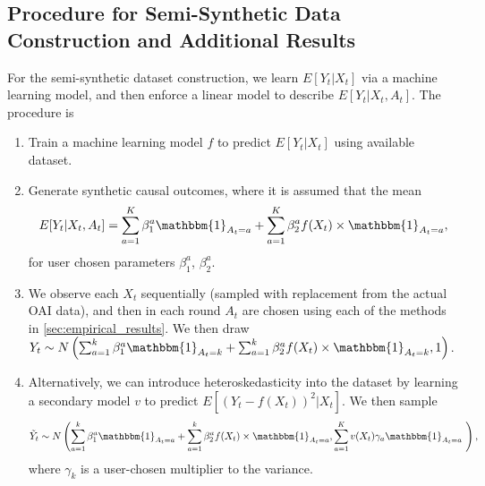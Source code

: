 \documentclass[11pt]{article}
\begin{document}
\begin{appendix}
\section{Procedure for Semi-Synthetic Data Construction and Additional Results} \label{appendix:dataset_construction}
For the semi-synthetic dataset construction, we learn $E[Y_{t} | X_{t}]$ via a machine learning model, and then enforce a linear model to describe $E[Y_{t} | X_{t}, A_{t}]$. The procedure is
 \begin{enumerate}
     \item Train a machine learning model $f$ to predict $E[Y_{t} | X_{t}]$ using available dataset. 
     \item Generate synthetic causal outcomes, where it is assumed that the mean
    $$ E[Y_t | X_{t}, A_{t}] = \sum_{a=1}^{K}\beta^{a}_{1} \mathbbm{1}_{A_{t}=a} + \sum_{a=1}^{K}\beta_{2}^{a} f(X_{t}) \times \mathbbm{1}_{A_{t}=a},$$
     for user chosen parameters $\beta^{a}_{1}$, $\beta^{a}_{2}$.
     \item We observe each $X_{t}$ sequentially (sampled with replacement from the actual OAI data), and then in each round $A_{t}$ are chosen using each of the methods in \cref{sec:empirical_results}. We then draw $Y_{t} \sim N\left(\sum_{a=1}^{k}\beta^{a}_{1} \mathbbm{1}_{A_{t}=k} + \sum_{a=1}^{k}\beta_{2}^{a} f(X_{t}) \times \mathbbm{1}_{A_{t}=k},1 \right)$.
     \item  Alternatively, we can introduce heteroskedasticity into the dataset by learning a secondary model $v$ to predict $E\left[\left(Y_{t} - f(X_{t})\right)^{2} | X_{t}\right]$. We then sample 
     $$\tilde{Y}_{t} \sim N\left(\sum_{a=1}^{k}\beta^{a}_{1} \mathbbm{1}_{A_{t}=a} + \sum_{a=1}^{k}\beta_{2}^{a} f(X_{t}) \times \mathbbm{1}_{A_{t}=a}, \sum_{a=1}^{K} v(X_{t}) \gamma_{a} \mathbbm{1}_{A_{t}=a} \ \right),$$ where $\gamma_{k}$ is a user-chosen multiplier to the variance. 


\end{enumerate}
\end{appendix}
\end{document}
